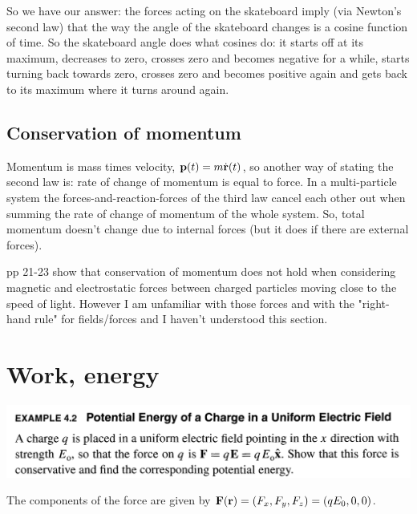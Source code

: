 So we have our answer: the forces acting on the skateboard imply (via Newton's
second law) that the way the angle of the skateboard changes is a cosine
function of time. So the skateboard angle does what cosines do: it starts off
at its maximum, decreases to zero, crosses zero and becomes negative for a
while, starts turning back towards zero, crosses zero and becomes positive
again and gets back to its maximum where it turns around again.


\subsection{Conservation of momentum}

Momentum is mass times velocity, $\mathbf{p}(t) = m\dot {\mathbf{r}}(t)$, so another way of
stating the second law is: rate of change of momentum is equal to force. In a
multi-particle system the forces-and-reaction-forces of the third law cancel
each other out when summing the rate of change of momentum of the whole
system. So, total momentum doesn't change due to internal forces (but it does
if there are external forces).

pp 21-23 show that conservation of momentum does not hold when considering
magnetic and electrostatic forces between charged particles moving close to the
speed of light. However I am unfamiliar with those forces and with the
"right-hand rule" for fields/forces and I haven't understood this section.


\section{Work, energy}

\begin{mdframed}
  \includegraphics[width=400pt]{img/physics--classical-mechanics--taylor--ex-4-2.png}
\end{mdframed}

The components of the force are given by $\mathbf{F}(\mathbf{r}) = (F_x, F_y, F_z) = (qE_0, 0, 0)$.

